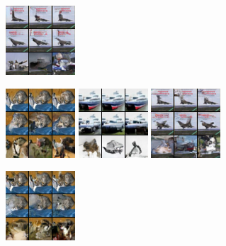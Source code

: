 \begin{figure}[t]
\begin{subfigure}[t]{0.17\textwidth}
      \includegraphics[height=\cifarimgheight]{figs/cigcvae/image-samples/cifar10/freeform_aipo_3_imagenet_samples}
      \caption{\scriptsize {}}
    \end{subfigure}
    \begin{subfigure}[t]{0.17\textwidth}
      \centering
      \includegraphics[height=\cifarimgheight]{figs/cigcvae/image-samples/cifar10/freeform_aipo_0_scratch_samples}
      \includegraphics[height=\cifarimgheight]{figs/cigcvae/image-samples/cifar10/freeform_aipo_1_scratch_samples}
      \includegraphics[height=\cifarimgheight]{figs/cigcvae/image-samples/cifar10/freeform_aipo_3_scratch_samples}
      \caption{\scriptsize {}}
    \end{subfigure}
    \begin{subfigure}[t]{0.17\textwidth}
      \centering
      \includegraphics[height=\cifarimgheight]{figs/cigcvae/image-samples/cifar10/freeform_aipo-r_0_samples}

\end{subfigure}
\end{figure}
